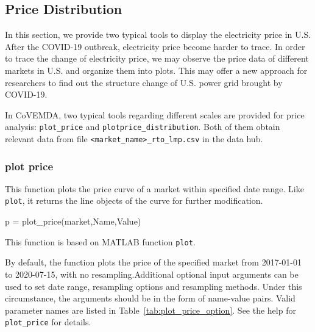 \documentclass[11pt]{article}
\newcommand{\covemda}{CoVEMDA}
\newcommand{\matlab}{\textsc{MATLAB}}
\numberwithin{equation}{section}
\numberwithin{table}{section}
\numberwithin{figure}{section}
\begin{document}
\subsection{Price Distribution}

In this section, we provide two typical tools to display the electricity price in U.S.  After the COVID-19 outbreak, electricity price become harder to trace. In order to trace the change of electricity price, we may observe the price data of different markets in U.S. and organize them into plots. This may offer a new approach for researchers to find out the structure change of U.S. power grid brought by COVID-19.

In \covemda{}, two typical tools regarding different scales are provided for price analysis: \verb!plot_price! and \verb!plotprice_distribution!. Both of them obtain relevant data from file \verb!<market_name>_rto_lmp.csv! in the data hub.

\subsubsection{plot price}

This function plots the price curve of a market within specified date range. Like \verb!plot!, it returns the line objects of the curve for further modification.

\begin{Code}
  p = plot_price(market,Name,Value)
\end{Code}

This function is based on \matlab{} function \verb!plot!.

By default, the function plots the price of the specified market from 2017-01-01 to 2020-07-15, with no resampling.Additional optional input arguments can be used to set date range, resampling options and resampling methods. Under this circumstance, the arguments should be in the form of name-value pairs. Valid parameter names are listed in Table~\ref{tab:plot_price_option}. See the help for \verb!plot_price! for details.
\end{document}
